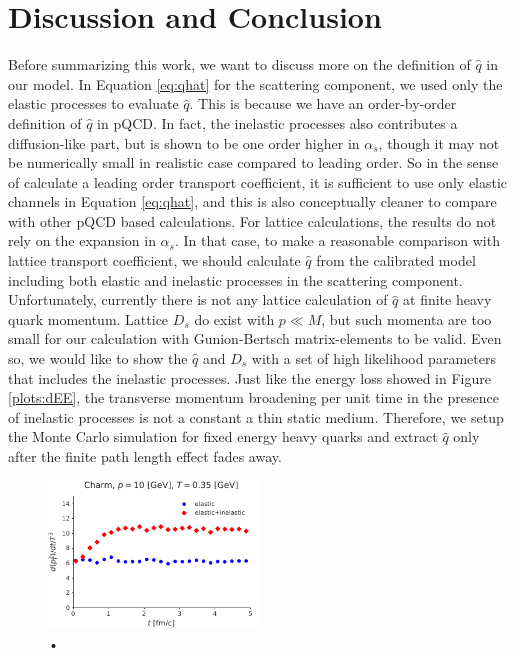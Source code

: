 \documentclass[aps, prc, reprint, amsmath, groupedaddress, nofootinbib]{revtex4-1}
\begin{document}
\section{Discussion and Conclusion}\label{section:conclusion}
Before summarizing this work, we want to discuss more on the definition of $\hat{q}$ in our model.
In Equation \ref{eq:qhat} for the scattering component, we used only the elastic processes to evaluate $\hat{q}$.
This is because we have an order-by-order definition of $\hat{q}$ in pQCD.
In fact, the inelastic processes also contributes a diffusion-like part, but is shown to be one order higher in $\alpha_s$, though it may not be numerically small in realistic case compared to leading order.
So in the sense of calculate a leading order transport coefficient, it is sufficient to use only elastic channels in Equation \ref{eq:qhat}, and this is also conceptually cleaner to compare with other pQCD based calculations.
For lattice calculations, the results do not rely on the expansion in $\alpha_s$.
In that case, to make a reasonable comparison with lattice transport coefficient, we should calculate $\hat{q}$ from the calibrated model including both elastic and inelastic processes in the scattering component.
Unfortunately, currently there is not any lattice calculation of $\hat{q}$ at finite heavy quark momentum.  
Lattice $D_s$ do exist with $p \ll M$, but such momenta are too small for our calculation with Gunion-Bertsch matrix-elements to be valid.
Even so, we would like to show the $\hat{q}$ and $D_s$ with a set of high likelihood parameters that includes the inelastic processes.
Just like the energy loss showed in Figure \ref{plots:dEE}, the transverse momentum broadening per unit time in the presence of inelastic processes is not a constant a thin static medium.
Therefore, we setup the Monte Carlo simulation for fixed energy heavy quarks and extract $\hat{q}$ only after the finite path length effect fades away. 
\begin{figure}
\includegraphics[width=0.5\textwidth]{qhat_full.pdf}
\caption{•}\label{plots:transport_full}
\end{figure}
\end{document}
